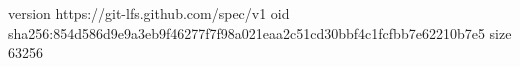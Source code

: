 version https://git-lfs.github.com/spec/v1
oid sha256:854d586d9e9a3eb9f46277f7f98a021eaa2c51cd30bbf4c1fcfbb7e62210b7e5
size 63256
